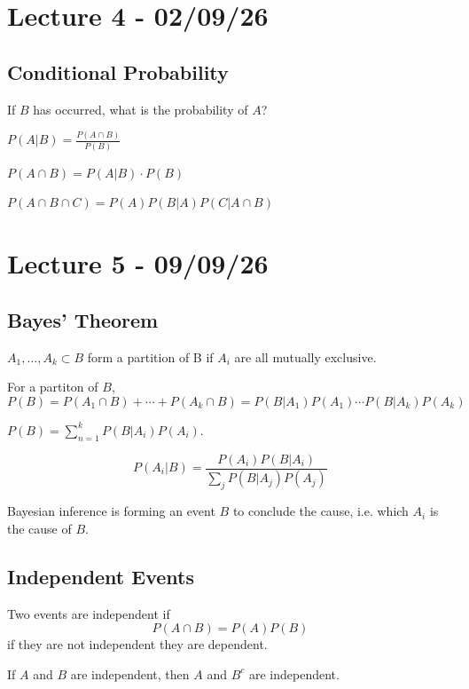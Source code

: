 \documentclass[11pt]{article}
\begin{document}
\section{Lecture 4 - 02/09/26}
\subsection{Conditional Probability}

If $B$ has occurred, what is the probability of $A$?
\begin{theorem}
    $P(A|B) = \frac{P(A \cap B)}{P(B)}$
\end{theorem}
\begin{theorem}
    $P(A \cap B) = P(A|B) \cdot P(B)$
\end{theorem}
\begin{theorem}
    $P(A \cap B \cap C) = P(A)P(B|A)P(C|A \cap B)$
\end{theorem}

\section{Lecture 5 - 09/09/26}
\subsection{Bayes' Theorem}
\begin{definition}
    $A_1, \dots, A_k \subset B$ form a partition of B if $A_i$ are all mutually exclusive.
\end{definition}
\begin{remark}
    For a partiton of $B$,
    \[
        P(B) = P(A_1 \cap B) + \cdots + P(A_k\cap B) = P(B|A_1)P(A_1) \cdots P(B|A_k)P(A_k)
    \]
\end{remark}
\begin{theorem}
    $P(B) = \sum_{n=1}^{k}P(B|A_i)P(A_i)$.
\end{theorem}
\begin{theorem}
    \[
        P(A_i | B) = \frac{P(A_i)P(B|A_i)}{\sum_{j} P(B|A_j)P(A_j)}
    \]
\end{theorem}
Bayesian inference is forming an event $B$ to conclude the cause, i.e. which $A_i$ is the cause of $B$.
\subsection{Independent Events}
\begin{definition}
    Two events are independent if 
    \[
        P(A \cap B) = P(A)P(B)
    \]
    if they are not independent they are dependent.
\end{definition}
\begin{theorem}
    If $A$ and $B$ are independent, then $A$ and $B^c$ are independent.
\end{theorem}
\end{document}

